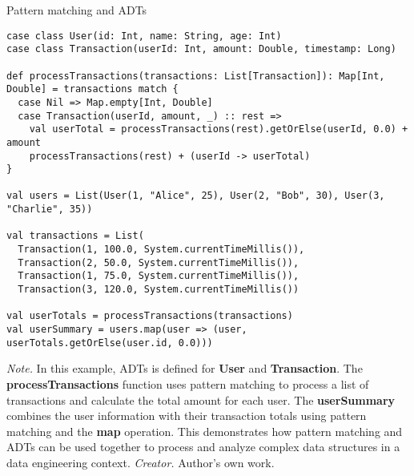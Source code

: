 \begin{table}[h!]
\caption{Pattern matching and ADTs}
\begin{lstlisting}
case class User(id: Int, name: String, age: Int)
case class Transaction(userId: Int, amount: Double, timestamp: Long)

def processTransactions(transactions: List[Transaction]): Map[Int, Double] = transactions match {
  case Nil => Map.empty[Int, Double]
  case Transaction(userId, amount, _) :: rest =>
    val userTotal = processTransactions(rest).getOrElse(userId, 0.0) + amount
    processTransactions(rest) + (userId -> userTotal)
}

val users = List(User(1, "Alice", 25), User(2, "Bob", 30), User(3, "Charlie", 35))

val transactions = List(
  Transaction(1, 100.0, System.currentTimeMillis()),
  Transaction(2, 50.0, System.currentTimeMillis()),
  Transaction(1, 75.0, System.currentTimeMillis()),
  Transaction(3, 120.0, System.currentTimeMillis())

val userTotals = processTransactions(transactions)
val userSummary = users.map(user => (user, userTotals.getOrElse(user.id, 0.0)))
\end{lstlisting}
\small
\textit{Note.} In this example, ADTs is defined for \textbf{User} and \textbf{Transaction}. The \textbf{processTransactions} function uses pattern matching to process a list of transactions and calculate the total amount for each user. The \textbf{userSummary} combines the user information with their transaction totals using pattern matching and the \textbf{map} operation. This demonstrates how pattern matching and ADTs can be used together to process and analyze complex data structures in a data engineering context.
\textit{Creator.} Author's own work.
\end{table}

